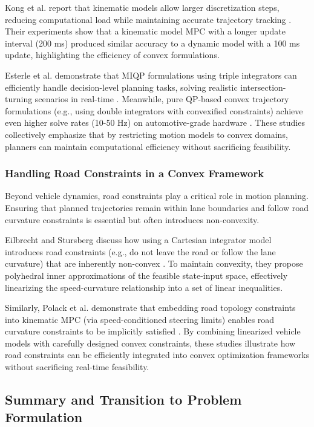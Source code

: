 Kong et al.
report that kinematic models allow larger discretization steps, reducing computational load while maintaining accurate trajectory tracking \cite{kong_kinematic_2015}.
Their experiments show that a kinematic model MPC with a longer update interval (200 ms) produced similar accuracy to a dynamic model with a 100 ms
update, highlighting the efficiency of convex formulations.

Esterle et al.
demonstrate that MIQP formulations using triple integrators can efficiently handle decision-level planning tasks, solving realistic intersection-turning scenarios in real-time \cite{esterle_optimal_2020}.
Meanwhile, pure QP-based convex trajectory formulations (e.g., using double integrators with convexified constraints) achieve even higher solve rates
(10-50 Hz) on automotive-grade hardware \cite{polack_guaranteeing_2018}.
These studies collectively emphasize that by restricting motion models to convex domains, planners can maintain computational efficiency without
sacrificing feasibility.

\subsubsection{Handling Road Constraints in a Convex Framework}

Beyond vehicle dynamics, road constraints play a critical role in motion planning.
Ensuring that planned trajectories remain within lane boundaries and follow road curvature constraints is essential but often introduces
non-convexity.

Eilbrecht and Stursberg discuss how using a Cartesian integrator model introduces road constraints (e.g., do not leave the road or follow the lane
curvature) that are inherently non-convex \cite{eilbrecht_challenges_2020}.
To maintain convexity, they propose polyhedral inner approximations of the feasible state-input space, effectively linearizing the speed-curvature
relationship into a set of linear inequalities.

Similarly, Polack et al.
demonstrate that embedding road topology constraints into kinematic MPC (via speed-conditioned steering limits) enables road curvature constraints to be implicitly satisfied \cite{polack_guaranteeing_2018}.
By combining linearized vehicle models with carefully designed convex constraints, these studies illustrate how road constraints can be efficiently
integrated into convex optimization frameworks without sacrificing real-time feasibility.

\subsection{Summary and Transition to Problem Formulation}

